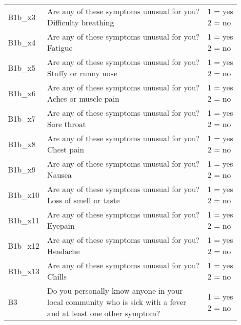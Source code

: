 \begin{tabularx}{\linewidth}{p{1.9cm} <{\RaggedRight}X <{\RaggedRight\arraybackslash}p{4.3cm}}
    B1b\_x3& \thead{Are any of these symptoms unusual for you?\\Difficulty breathing} & \thead{1 = yes\\2 = no} \\
    B1b\_x4& \thead{Are any of these symptoms unusual for you?\\Fatigue} & \thead{1 = yes\\2 = no} \\
    B1b\_x5& \thead{Are any of these symptoms unusual for you?\\Stuffy or runny nose} & \thead{1 = yes\\2 = no} \\
    B1b\_x6& \thead{Are any of these symptoms unusual for you?\\Aches or muscle pain} & \thead{1 = yes\\2 = no} \\
    B1b\_x7& \thead{Are any of these symptoms unusual for you?\\Sore throat} & \thead{1 = yes\\2 = no} \\
    B1b\_x8& \thead{Are any of these symptoms unusual for you?\\Chest pain} & \thead{1 = yes\\2 = no} \\
    B1b\_x9& \thead{Are any of these symptoms unusual for you?\\Nausea} & \thead{1 = yes\\2 = no} \\
    B1b\_x10& \thead{Are any of these symptoms unusual for you?\\Loss of smell or taste} & \thead{1 = yes\\2 = no} \\
    B1b\_x11& \thead{Are any of these symptoms unusual for you?\\Eyepain} & \thead{1 = yes\\2 = no} \\
    B1b\_x12& \thead{Are any of these symptoms unusual for you?\\Headache} & \thead{1 = yes\\2 = no} \\
    B1b\_x13& \thead{Are any of these symptoms unusual for you?\\Chills} & \thead{1 = yes\\2 = no} \\
    B3& \thead{Do you personally know anyone in your \\local community who is sick with a fever \\and at least one other symptom?} & \thead{1 = yes\\2 = no} \\

\end{tabularx}
